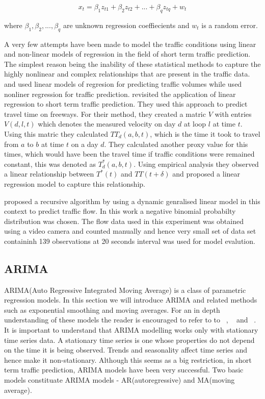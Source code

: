         \begin{equation}
            x_{t} = \beta_{1}z_{t1} + \beta_{2}z_{t2} + ... + \beta_{q}z_{tq} + w_{t}
        \end{equation}

where $ \beta_{1}, \beta_{2},...,\beta_{q} $ are unknown regression coeffiecients and $w_{t}$ is
a random error.

A very few attempts have been made to model the traffic conditions using linear and non-linear
models of regression in the field of short term traffic prediction. The simplest reason being the
inability of these statistical methods to capture the highly nonlinear and complex relationships that
are present in the traffic data. \citet{low1972new} and \citet{jensen1973calibrating}
used linear models of regresion for predicting traffic volumes while \citet{hogberg1976estimation}
used nonliner regression for traffic prediction. \citet{rice2004simple} revisited the application of
linear regression to short term traffic prediction. They used this approach to predict travel time
on freeways. For their method, they created a matric $V$ with entries $V(d,l,t)$ which denotes the
measured velocity on day $d$ at loop $l$ at time $t$. Using this matric they calculated $TT_{d}(a,b,t)$,
which is the time it took to travel from $a$ to $b$ at time $t$ on a day $d$. They calculated another
proxy value for this times, which would have been the travel time if traffic conditions were remained
constant, this was denoted as $T^*_{d}(a,b,t)$. Using empirical analysis they observed a linear
relationship between $T^*(t)$ and $TT(t+\delta)$ and proposed a linear regression model to capture this
relationship.

\citet{lan1999real} proposed a recursive algorithm by using a dynamic genralised linear model
in this context to predict traffic flow. In this work a negative binomial probabilty distribution
was chosen. The flow data used in this experiment was obtained using a video camera and counted
manually and hence very small set of data set containinh 139 observations at 20 seconds interval
was used for model evalution.

\subsection{ARIMA}
ARIMA(Auto Regressive Integrated Moving Average) is a class of parametric regression models. In
this section we will introduce ARIMA and related methods such as exponential smoothing and moving
averages. For an in depth understanding of these models the reader is encouraged to refer to to
~\citet{tong1990non}, ~\citet{brockwell2006introduction} and ~\citet{box2015time}. It is
important to understand that ARIMA modelling works only with stationary time series data. A
stationary time series is one whose properties do not depend on the time it is being observed.
Trends and seasonality affect time series and hence make it non-stationary. Although this seems as a
big restriction, in short term traffic prediction, ARIMA models have been very successful. Two
basic models constituate ARIMA models - AR(autoregressive) and MA(moving average).

